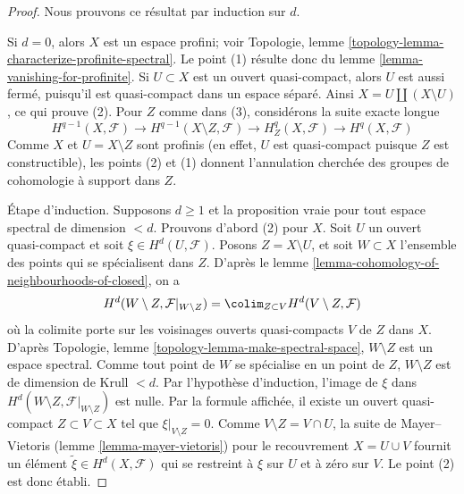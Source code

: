 \begin{proof}
Nous prouvons ce résultat par induction sur $d$.

\medskip\noindent

Si $d = 0$, alors $X$ est un espace profini; voir Topologie, lemme \ref{topology-lemma-characterize-profinite-spectral}. Le point (1) résulte donc du lemme \ref{lemma-vanishing-for-profinite}. Si $U \subset X$ est un ouvert quasi-compact, alors $U$ est aussi fermé, puisqu'il est quasi-compact dans un espace séparé. Ainsi $X = U \amalg (X \setminus U)$, ce qui prouve (2). Pour $Z$ comme dans (3), considérons la suite exacte longue
$$
H^{q - 1}(X, \mathcal{F}) \to
H^{q - 1}(X \setminus Z, \mathcal{F}) \to
H^q_Z(X, \mathcal{F}) \to H^q(X, \mathcal{F})
$$
Comme $X$ et $U = X \setminus Z$ sont profinis (en effet, $U$ est quasi-compact puisque $Z$ est constructible), les points (2) et (1) donnent l'annulation cherchée des groupes de cohomologie à support dans $Z$.

\medskip\noindent

Étape d'induction. Supposons $d \geq 1$ et la proposition vraie pour tout espace spectral de dimension $< d$. Prouvons d'abord (2) pour $X$. Soit $U$ un ouvert quasi-compact et soit $\xi \in H^d(U, \mathcal{F})$. Posons $Z = X \setminus U$, et soit $W \subset X$ l'ensemble des points qui se spécialisent dans $Z$. D'après le lemme \ref{lemma-cohomology-of-neighbourhoods-of-closed}, on a
$$
H^d(W \setminus Z, \mathcal{F}|_{W \setminus Z}) =
\colim_{Z \subset V} H^d(V \setminus Z, \mathcal{F})
$$
où la colimite porte sur les voisinages ouverts quasi-compacts $V$ de $Z$ dans $X$.
D'après Topologie, lemme \ref{topology-lemma-make-spectral-space},
$W \setminus Z$ est un espace spectral. Comme tout point de $W$ se spécialise en un point de $Z$,
$W \setminus Z$ est de dimension de Krull $< d$. Par l'hypothèse d'induction, l'image de $\xi$ dans
$H^d(W \setminus Z, \mathcal{F}|_{W \setminus Z})$ est nulle. Par la formule affichée, il existe un ouvert quasi-compact $Z \subset V \subset X$
tel que $\xi|_{V \setminus Z} = 0$. Comme $V \setminus Z = V \cap U$, la suite de Mayer–Vietoris (lemme \ref{lemma-mayer-vietoris}) pour le recouvrement $X = U \cup V$
fournit un élément $\tilde \xi \in H^d(X, \mathcal{F})$ qui se restreint à $\xi$ sur $U$ et à zéro sur $V$. Le point (2) est donc établi.

\medskip\noindent


\end{proof}
